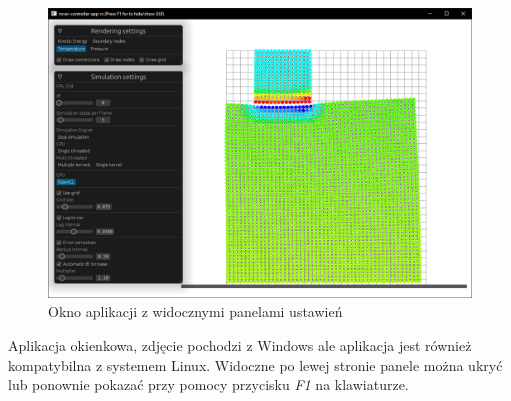 \documentclass[12pt, letterpaper]{report}
\begin{document}
    \begin{figure}[H]
        \centering
        \includegraphics[width=17cm]{app_view_full.png}
        \caption{Okno aplikacji z widocznymi panelami ustawień}
    \end{figure}

    Aplikacja okienkowa, zdjęcie pochodzi z Windows ale aplikacja jest również kompatybilna z 
    systemem Linux. Widoczne po lewej stronie panele można ukryć lub ponownie pokazać przy pomocy
    przycisku \emph{F1} na klawiaturze.
\end{document}
